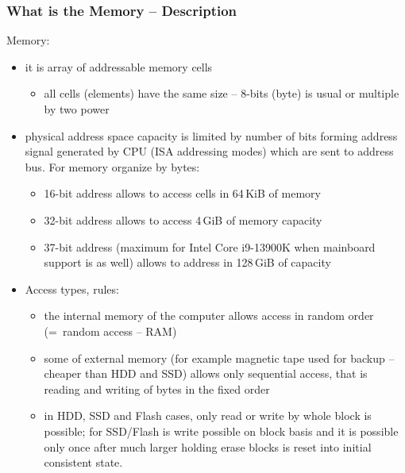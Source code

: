 \documentclass{beamer}
\begin{document}
\begin{frame}[shrink=2]
\frametitle{What is the Memory -- Description}

Memory:
\begin{itemize}
\item it is array of addressable memory cells
\begin{itemize}
\item all cells (elements) have the same size -- 8-bits (byte) is usual or multiple by two power
\end{itemize}
\item physical address space capacity is limited by number of bits forming address signal generated by CPU (ISA addressing modes) which are sent to address bus. For memory organize by bytes:
\begin{itemize}
\item 16-bit address allows to access cells in 64\,KiB of memory
\item 32-bit address allows to access  4\,GiB of memory capacity
\item 37-bit address (maximum for Intel Core  i9-13900K when mainboard support is as well) allows to address in 128\,GiB of capacity
\end{itemize}
\item Access types, rules:
\begin{itemize}
\item the internal memory of the computer allows access in random order (=~random access -- RAM)
\item some of external memory (for example magnetic tape used for backup -- cheaper than HDD and SSD) allows only sequential access, that is reading and writing of bytes in the fixed order
\item in HDD, SSD and Flash cases, only read or write by whole block is possible; for SSD/Flash is write possible on block basis and it is possible only once after much larger holding erase blocks is reset into initial consistent state.
\end{itemize}
\end{itemize}

\end{frame}
\end{document}
